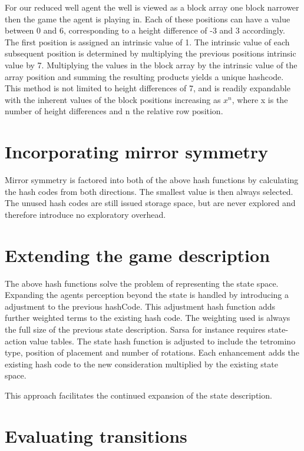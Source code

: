 \documentclass{rucsthesis}
\begin{document}
For our reduced well agent the well is viewed as a block array one block narrower then the game the agent is playing in. Each of these positions can have a value between 0 and 6, corresponding to a height difference of -3 and 3 accordingly. The first position is assigned an intrinsic value of 1. The intrinsic value of each subsequent position is determined by multiplying the previous positions intrinsic value by 7. Multiplying the values in the block array by the intrinsic value of the array position and summing the resulting products yields a unique hashcode. This method is not limited to height differences of 7, and is readily expandable with the inherent values of the block positions increasing as $x^n$, where x is the number of height differences and n the relative row position.

\section{Incorporating mirror symmetry}

Mirror symmetry is factored into both of the above hash functions by calculating the hash codes from both directions. The smallest value is then always selected. The unused hash codes are still issued storage space, but are never explored and therefore introduce no exploratory overhead.

\section{Extending the game description}

The above hash functions solve the problem of representing the state space. Expanding the agents perception beyond the state is handled by introducing a adjustment to the previous hashCode. This adjustment hash function adds further weighted terms to the existing hash code. The weighting used is always the full size of the previous state description. Sarsa for instance requires state-action value tables. The state hash function is adjusted to include the tetromino type, position of placement and number of rotations. Each enhancement adds the existing hash code to the new consideration multiplied by the existing state space.

This approach facilitates the continued expansion of the state description. 
 
\section{Evaluating transitions}
\end{document}
